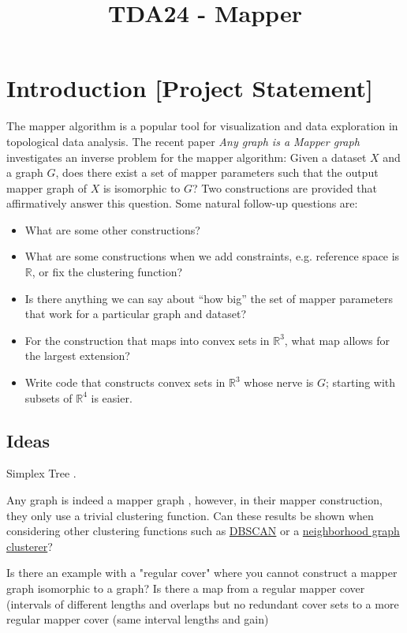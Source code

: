 \documentclass{article}
\title{TDA24 - Mapper}
\author{}
\date{}
\def\R{\mathbb{R}}
\begin{document}
\maketitle

\section{Introduction [Project Statement]}

The mapper algorithm is a popular tool for visualization and data exploration in topological data analysis. The recent paper \textit{Any graph is a Mapper graph} \cite{alvarado2024graphmappergraph} investigates an inverse problem for the mapper algorithm: \linebreak
Given a dataset $X$ and a graph $G$, does there exist a set of mapper parameters such that the output mapper graph of $X$ is isomorphic to $G$? Two constructions are provided that affirmatively answer this question. Some natural follow-up questions are:
\begin{itemize}
    \item What are some other constructions?
    \item What are some constructions when we add constraints, e.g. reference space is $\R$, or fix the clustering function?    
    \item Is there anything we can say about ``how big'' the set of mapper parameters that work for a particular graph and dataset? 
    \item For the construction that maps into convex sets in $\R^3$, what map allows for the largest extension?
    \item Write code that constructs convex sets in $\R^3$ whose nerve is $G$; starting with subsets of $\R^4$ is easier.
    \end{itemize}

\subsection{Ideas}

Simplex Tree \cite{simplex-tree-Boissonnat_2014}.

Any graph is indeed a mapper graph \cite{alvarado2024graphmappergraph}, however, in their mapper construction, they only use a trivial clustering function. Can these results be shown when considering other clustering functions such as \underline{DBSCAN} \cite{DBSCAN} or a \underline{neighborhood graph clusterer}?

Is there an example with a "regular cover" where you cannot construct a mapper graph isomorphic to a graph? 
Is there a map from a regular mapper cover (intervals of different lengths and overlaps but no redundant cover sets to a more regular mapper cover (same interval lengths and gain)
\end{document}
